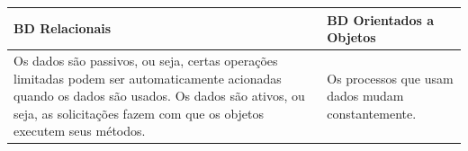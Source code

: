 \begin{quadro}[!htb]
  \centering
  \caption[Exemplo de Quadro]{Exemplo de Quadro.
    \label{qua:quadro-exemplo1}}
  \begin{tabular}{|p{7cm}|p{7cm}|}
    \hline
    \textbf{BD Relacionais}                                                                                                                                                                                                  & \textbf{BD Orientados a Objetos}                  \\
    \hline
    Os dados são passivos, ou seja, certas operações limitadas podem ser automaticamente acionadas quando os dados são usados. Os dados são ativos, ou seja, as solicitações fazem com que os objetos executem seus métodos. & Os processos que usam dados mudam constantemente. \\
    \hline
  \end{tabular}
\end{quadro}

